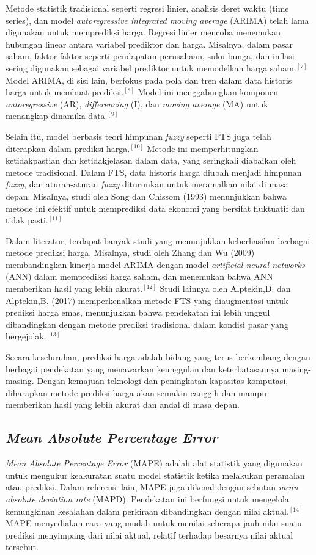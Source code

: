 \documentclass[conference]{IEEEtran}
\begin{document}
Metode statistik tradisional seperti regresi linier, analisis deret waktu (time series), dan model \textit{autoregressive integrated moving average} (ARIMA) telah lama digunakan untuk memprediksi harga. Regresi linier mencoba menemukan hubungan linear antara variabel prediktor dan harga. Misalnya, dalam pasar saham, faktor-faktor seperti pendapatan perusahaan, suku bunga, dan inflasi sering digunakan sebagai variabel prediktor untuk memodelkan harga saham.$^{[7]}$ Model ARIMA, di sisi lain, berfokus pada pola dan tren dalam data historis harga untuk membuat prediksi.$^{[8]}$ Model ini menggabungkan komponen \textit{autoregressive} (AR), \textit{differencing} (I), dan \textit{moving average} (MA) untuk menangkap dinamika data.$^{[9]}$

Selain itu, model berbasis teori himpunan \textit{fuzzy} seperti FTS juga telah diterapkan dalam prediksi harga.$^{[10]}$ Metode ini memperhitungkan ketidakpastian dan ketidakjelasan dalam data, yang seringkali diabaikan oleh metode tradisional. Dalam FTS, data historis harga diubah menjadi himpunan \textit{fuzzy}, dan aturan-aturan \textit{fuzzy} diturunkan untuk meramalkan nilai di masa depan. Misalnya, studi oleh Song dan Chissom (1993) menunjukkan bahwa metode ini efektif untuk memprediksi data ekonomi yang bersifat fluktuatif dan tidak pasti.$^{[11]}$

Dalam literatur, terdapat banyak studi yang menunjukkan keberhasilan berbagai metode prediksi harga. Misalnya, studi oleh Zhang dan Wu (2009) membandingkan kinerja model ARIMA dengan model \textit{artificial neural networks} (ANN) dalam memprediksi harga saham, dan menemukan bahwa ANN memberikan hasil yang lebih akurat.$^{[12]}$ Studi lainnya oleh Alptekin,D. dan Alptekin,B. (2017) memperkenalkan metode FTS yang diaugmentasi untuk prediksi harga emas, menunjukkan bahwa pendekatan ini lebih unggul dibandingkan dengan metode prediksi tradisional dalam kondisi pasar yang bergejolak.$^{[13]}$

Secara keseluruhan, prediksi harga adalah bidang yang terus berkembang dengan berbagai pendekatan yang menawarkan keunggulan dan keterbatasannya masing-masing. Dengan kemajuan teknologi dan peningkatan kapasitas komputasi, diharapkan metode prediksi harga akan semakin canggih dan mampu memberikan hasil yang lebih akurat dan andal di masa depan.

\subsection{\textit{Mean Absolute Percentage Error}}
\textit{Mean Absolute Percentage Error} (MAPE) adalah alat statistik yang digunakan untuk mengukur keakuratan suatu model statistik ketika melakukan peramalan atau prediksi. Dalam referensi lain, MAPE juga dikenal dengan sebutan \textit{mean absolute deviation rate} (MAPD). Pendekatan ini berfungsi untuk mengelola kemungkinan kesalahan dalam perkiraan dibandingkan dengan nilai aktual.$^{[14]}$ MAPE menyediakan cara yang mudah untuk menilai seberapa jauh nilai suatu prediksi menyimpang dari nilai aktual, relatif terhadap besarnya nilai aktual tersebut.
\end{document}
